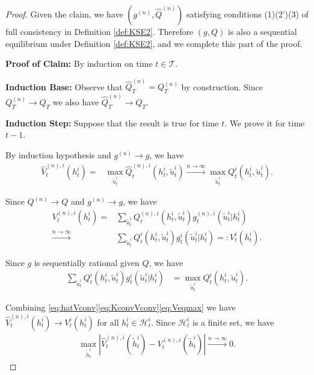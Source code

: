 \documentclass[pdflatex,sn-basic]{sn-jnl}
\newcommand{\Qfunc}{Q}
\theoremstyle{thmstyleone}%
\theoremstyle{thmstyletwo}%
\theoremstyle{thmstylethree}%
\begin{document}
\begin{appendices}
\begin{proof}
		Given the claim, we have $(g^{(n)}, \hat{\Qfunc}^{(n)})$ satisfying conditions (1)(2')(3) of full consistency in Definition \ref{def:KSE2}. Therefore $(g, \Qfunc)$ is also a sequential equilibrium under Definition \ref{def:KSE2}, and we complete this part of the proof.
		
		\textbf{Proof of Claim:} By induction on time $t\in\mathcal{T}$.
		
		\textbf{Induction Base:} Observe that $\hat{\Qfunc}_T^{(n)} = \Qfunc_T^{(n)}$ by construction. Since $\Qfunc_T^{(n)}\rightarrow \Qfunc_T$ we also have $\hat{\Qfunc}_T^{(n)} \rightarrow \Qfunc_T$.
		
		\textbf{Induction Step:} Suppose that the result is true for time $t$. We prove it for time $t-1$.
		
		By induction hypothesis and $g^{(n)}\rightarrow g$, we have
		\begin{align}
			\hat{V}_t^{(n), i}(h_t^i) =& \max_{\tilde{u}_t^i} \hat{\Qfunc}_t^{(n), i}(h_t^i, \tilde{u}_t^i)
			\xrightarrow{n\rightarrow\infty} \max_{\tilde{u}_t^i} \Qfunc_t^{i}(h_t^i, \tilde{u}_t^i).\label{eq:hatVconv}
		\end{align}
		
		Since $\Qfunc^{(n)} \rightarrow \Qfunc$ and $g^{(n)}\rightarrow g$, we have
		\begin{align}
			V_t^{(n), i}(h_t^i) =& \sum_{\tilde{u}_t^i} \Qfunc_t^{(n), i}(h_t^i, \tilde{u}_t^i)g_t^{(n), i}(\tilde{u}_t^i|h_t^i)\\
			\xrightarrow{n\rightarrow\infty}& \sum_{\tilde{u}_t^i} \Qfunc_t^{i}(h_t^i, \tilde{u}_t^i)g_t^{i}(\tilde{u}_t^i|h_t^i)=: V_t^i(h_t^i).\label{eq:KconvVconv}
		\end{align}
	
		Since $g$ is sequentially rational given $\Qfunc$, we have
		\begin{align}
			\sum_{\tilde{u}_t^i} \Qfunc_t^{i}(h_t^i, \tilde{u}_t^i)g_t^{i}(\tilde{u}_t^i|h_t^i) &= \max_{\tilde{u}_t^i} \Qfunc_t^{i}(h_t^i, \tilde{u}_t^i).\label{eq:Veqmax}
		\end{align}
	
		Combining \eqref{eq:hatVconv}\eqref{eq:KconvVconv}\eqref{eq:Veqmax} we have $\hat{V}_t^{(n), i}(h_t^i) \rightarrow V_t^{i}(h_t^i)$ for all $h_t^i\in\mathcal{H}_t^i$. Since $\mathcal{H}_t^i$ is a finite set, we have
		\begin{align}
			\max_{\tilde{h}_t^i}|\hat{V}_t^{(n), i}(\tilde{h}_t^i) - V_t^{(n), i}(\tilde{h}_t^i)| \xrightarrow{n\rightarrow\infty} 0.
		\end{align}
	

\end{proof}
\end{appendices}
\end{document}
